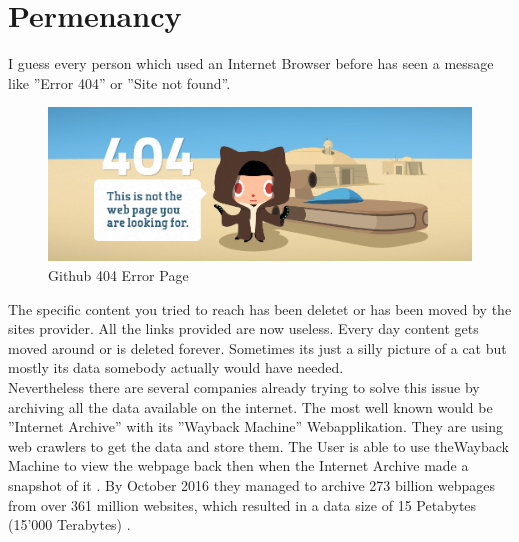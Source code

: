\documentclass[a4paper,11pt, oneside]{report}
\theoremstyle{definition}
\begin{document}
\section{Permenancy}
I guess every person which used an Internet Browser before has seen a message like ''Error 404'' or ''Site not found''.
\begin{figure}[H]
\centering
\includegraphics[width=\textwidth]{img/github-404.png}
\caption[Github 404 Error Page]{Github 404 Error Page}
\end{figure}
\noindent
The specific content you tried to reach has been deletet or has been moved by the sites provider. All the links provided are now useless. Every day content gets moved around or is deleted forever. Sometimes its just a silly picture of a cat but mostly its data somebody actually would have needed.\\[0.3cm]
Nevertheless there are several companies already trying to solve this issue by archiving all the data available on the internet. The most well known would be ''Internet Archive'' with its ''Wayback Machine'' Webapplikation. They are using web crawlers to get the data and store them. The User is able to use theWayback Machine to view the webpage back then when the Internet Archive made a snapshot of it \cite{InternetArchive}. By October 2016 they managed to archive 273 billion webpages from over 361 million websites, which resulted in a data size of 15 Petabytes (15'000 Terabytes) \cite{InternetArchiveCount}.

\newpage
\end{document}
